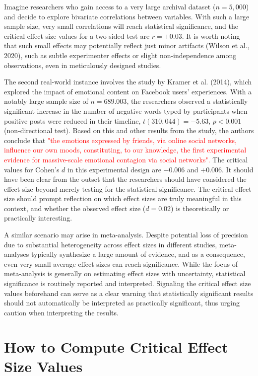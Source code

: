 \documentclass[
  man]{apa7}
\begin{document}
Imagine researchers who gain access to a very large archival dataset (\(n = 5,000\)) and decide to explore bivariate correlations between variables. With such a large sample size, very small correlations will reach statistical significance, and the critical effect size values for a two-sided test are \(r = \pm 0.03\). It is worth noting that such small effects may potentially reflect just minor artifacts (Wilson et al., 2020), such as subtle experimenter effects or slight non-independence among observations, even in meticulously designed studies.

The second real-world instance involves the study by Kramer et al. (2014), which explored the impact of emotional content on Facebook users' experiences. With a notably large sample size of \(n = 689.003\), the researchers observed a statistically significant increase in the number of negative words typed by participants when positive posts were reduced in their timeline, \(t(310,044) = −5.63\), \(p < 0.001\) (non-directional test). Based on this and other results from the study, the authors conclude that \textcolor{red}{"the emotions expressed by friends, via online social networks, influence our own moods, constituting, to our knowledge, the first experimental evidence for massive-scale emotional contagion via social networks".} The critical values for Cohen's \(d\) in this experimental design are \(-0.006\) and \(+0.006\). It should have been clear from the outset that the researchers should have considered the effect size beyond merely testing for the statistical significance. The critical effect size should prompt reflection on which effect sizes are truly meaningful in this context, and whether the observed effect size (\(d = 0.02\)) is theoretically or practically interesting.

A similar scenario may arise in meta-analysis. Despite potential loss of precision due to substantial heterogeneity across effect sizes in different studies, meta-analyses typically synthesize a large amount of evidence, and as a consequence, even very small average effect sizes can reach significance. While the focus of meta-analysis is generally on estimating effect sizes with uncertainty, statistical significance is routinely reported and interpreted. Signaling the critical effect size values beforehand can serve as a clear warning that statistically significant results should not automatically be interpreted as practically significant, thus urging caution when interpreting the results.

\hypertarget{how-to-compute-critical-effect-size-values}{%
\section{How to Compute Critical Effect Size Values}\label{how-to-compute-critical-effect-size-values}}
\end{document}
